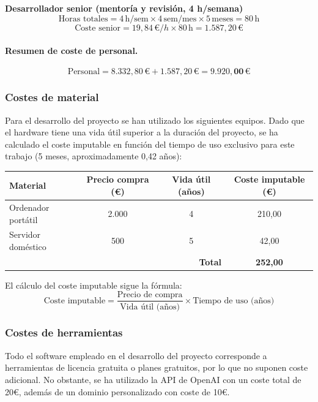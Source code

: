\noindent\textbf{Desarrollador senior (mentoría y revisión, 4 h/semana)}\\
\[
\text{Horas totales} = 4\,\text{h/sem} \times 4\,\text{sem/mes} \times 5\,\text{meses} = 80\,\text{h}
\]
\[
\text{Coste senior} = 19{,}84\,€/h \times 80\,\text{h} = 1.587{,}20\,€
\]

\paragraph{Resumen de coste de personal.}
\[
\text{Personal} = 8.332{,}80\,€ + 1.587{,}20\,€ = \mathbf{9.920{,}00\,€}
\]

\subsubsection{Costes de material}

Para el desarrollo del proyecto se han utilizado los siguientes equipos. Dado que el hardware tiene una vida útil superior a la duración del proyecto, se ha calculado el coste imputable en función del tiempo de uso exclusivo para este trabajo (5 meses, aproximadamente 0,42 años):

\begin{center}
\begin{tabular}{|l|c|c|c|}
\hline
\textbf{Material} & \textbf{Precio compra (€)} & \textbf{Vida útil (años)} & \textbf{Coste imputable (€)} \\
\hline
Ordenador portátil & 2.000 & 4 & 210,00 \\
Servidor doméstico & 500 & 5 & 42,00 \\
\hline
\multicolumn{3}{|r|}{\textbf{Total}} & \textbf{252,00} \\
\hline
\end{tabular}
\end{center}

\noindent El cálculo del coste imputable sigue la fórmula:
\begin{equation*}
\text{Coste imputable} = \frac{\text{Precio de compra}}{\text{Vida útil (años)}} \times \text{Tiempo de uso (años)}
\end{equation*}

\subsubsection{Costes de herramientas}

Todo el software empleado en el desarrollo del proyecto corresponde a herramientas de licencia gratuita o planes gratuitos, por lo que no suponen coste adicional. No obstante, se ha utilizado la API de OpenAI con un coste total de 20€, además de un dominio personalizado con coste de 10€.

